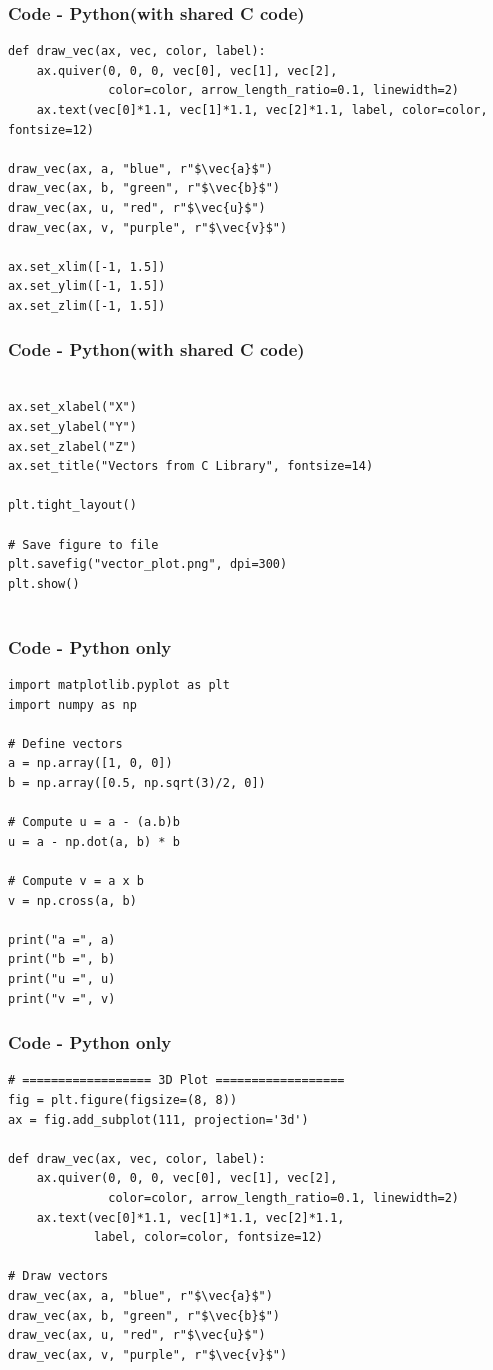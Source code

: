 \documentclass{beamer}
\theoremstyle{remark}
\let\vec\mathbf
\numberwithin{equation}{section}
\begin{document}
\begin{frame}[fragile]
\frametitle{Code - Python(with shared C code)}
\begin{lstlisting}
def draw_vec(ax, vec, color, label):
    ax.quiver(0, 0, 0, vec[0], vec[1], vec[2],
              color=color, arrow_length_ratio=0.1, linewidth=2)
    ax.text(vec[0]*1.1, vec[1]*1.1, vec[2]*1.1, label, color=color, fontsize=12)

draw_vec(ax, a, "blue", r"$\vec{a}$")
draw_vec(ax, b, "green", r"$\vec{b}$")
draw_vec(ax, u, "red", r"$\vec{u}$")
draw_vec(ax, v, "purple", r"$\vec{v}$")

ax.set_xlim([-1, 1.5])
ax.set_ylim([-1, 1.5])
ax.set_zlim([-1, 1.5])

\end{lstlisting}
\end{frame}

\begin{frame}[fragile]
\frametitle{Code - Python(with shared C code)}
\begin{lstlisting}

ax.set_xlabel("X")
ax.set_ylabel("Y")
ax.set_zlabel("Z")
ax.set_title("Vectors from C Library", fontsize=14)

plt.tight_layout()

# Save figure to file
plt.savefig("vector_plot.png", dpi=300) 
plt.show()


\end{lstlisting}
\end{frame}

\begin{frame}[fragile]
\frametitle{Code - Python only}
\begin{lstlisting}
import matplotlib.pyplot as plt
import numpy as np

# Define vectors
a = np.array([1, 0, 0])
b = np.array([0.5, np.sqrt(3)/2, 0])

# Compute u = a - (a.b)b
u = a - np.dot(a, b) * b

# Compute v = a x b
v = np.cross(a, b)

print("a =", a)
print("b =", b)
print("u =", u)
print("v =", v)
\end{lstlisting}
\end{frame}
\begin{frame}[fragile]
\frametitle{Code - Python only}
\begin{lstlisting}
# ================== 3D Plot ==================
fig = plt.figure(figsize=(8, 8))
ax = fig.add_subplot(111, projection='3d')

def draw_vec(ax, vec, color, label):
    ax.quiver(0, 0, 0, vec[0], vec[1], vec[2],
              color=color, arrow_length_ratio=0.1, linewidth=2)
    ax.text(vec[0]*1.1, vec[1]*1.1, vec[2]*1.1,
            label, color=color, fontsize=12)

# Draw vectors
draw_vec(ax, a, "blue", r"$\vec{a}$")
draw_vec(ax, b, "green", r"$\vec{b}$")
draw_vec(ax, u, "red", r"$\vec{u}$")
draw_vec(ax, v, "purple", r"$\vec{v}$")




\end{lstlisting}
\end{frame}
\end{document}
